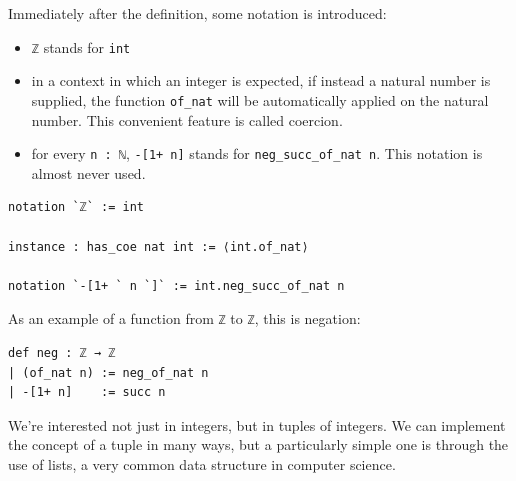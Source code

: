 \documentclass{book}
\theoremstyle{definition}
\theoremstyle{remark}
\theoremstyle{plain}
\begin{document}
Immediately after the definition, some notation is introduced:
\begin{itemize}
\item \lstinline{ℤ} stands for \lstinline{int}
\item in a context in which an integer is expected, if instead a natural number is supplied,
the function \lstinline{of_nat} will be automatically applied on the natural number.
This convenient feature is called coercion.
\item for every \lstinline{n : ℕ}, \lstinline{-[1+ n]} stands for \lstinline{neg_succ_of_nat n}.
This notation is almost never used.
\end{itemize}
\begin{lstlisting}
notation `ℤ` := int

instance : has_coe nat int := ⟨int.of_nat⟩

notation `-[1+ ` n `]` := int.neg_succ_of_nat n
\end{lstlisting}
As an example of a function from \lstinline{ℤ} to \lstinline{ℤ}, this is negation:
\begin{lstlisting}
def neg : ℤ → ℤ
| (of_nat n) := neg_of_nat n
| -[1+ n]    := succ n
\end{lstlisting}

We're interested not just in integers, but in tuples of integers.
We can implement the concept of a tuple in many ways,
but a particularly simple one is through the use of lists,
a very common data structure in computer science.
\end{document}
